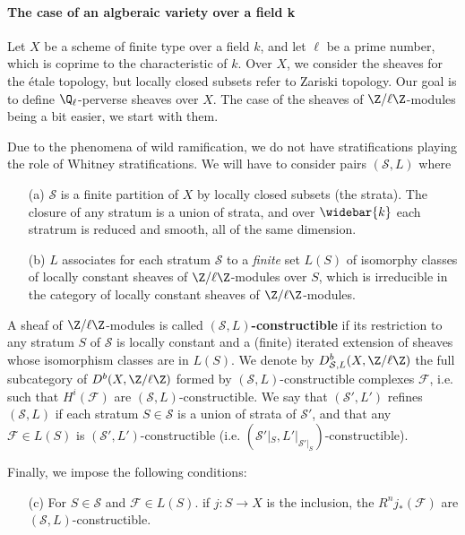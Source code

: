 \paragraph{The case of an algberaic variety over a field \texorpdfstring{k}{k}}
Let $X$ be a scheme of finite type over a field $k$, and let $\ell$ be a prime number, which is coprime to the characteristic of $k$. Over $X$, we consider the sheaves for the \'etale topology, but locally closed subsets refer to Zariski topology. Our goal is to define $\Q_\ell$-perverse sheaves over $X$. The case of the sheaves of $\Z/\ell\Z$-modules being a bit easier, we start with them.\par
Due to the phenomena of wild ramification, we do not have stratifications playing the role of Whitney stratifications. We will have to consider pairs $(\mathcal{S},L)$ where
\begin{enumerate}
    \item[(a)] $\mathcal{S}$ is a finite partition of $X$ by locally closed subsets (the strata). The closure of any stratum is a union of strata, and over $\widebar{k}$ each stratrum is reduced and smooth, all of the same dimension.
    \item[(b)] $L$ associates for each stratum $\mathcal{S}$ to a \textit{finite} set $L(S)$ of isomorphy classes of locally constant sheaves of $\Z/\ell\Z$-modules over $S$, which is irreducible in the category of locally constant sheaves of $\Z/\ell\Z$-modules.
\end{enumerate}

A sheaf of $\Z/\ell\Z$-modules is called \textbf{$(\mathcal{S},L)$-constructible} if its restriction to any stratum $S$ of $\mathcal{S}$ is locally constant and a (finite) iterated extension of sheaves whose isomorphism classes are in $L(S)$. We denote by $D^b_{\mathcal{S},L}(X,\Z/\ell\Z)$ the full subcategory of $D^b(X,\Z/\ell\Z)$ formed by $(\mathcal{S},L)$-constructible complexes $\mathscr{F}$, i.e. such that $H^i(\mathscr{F})$ are $(\mathcal{S},L)$-constructible. We say that $(\mathcal{S}',L')$ refines $(\mathcal{S},L)$ if each stratum $S\in\mathcal{S}$ is a union of strata of $\mathcal{S}'$, and that any $\mathscr{F}\in L(S)$ is $(\mathcal{S}',L')$-constructible (i.e. $(\mathcal{S}'|_S,L'|_{\mathcal{S}'|_S})$-constructible).\par
Finally, we impose the following conditions:
\begin{enumerate}
    \item[(c)] For $S\in\mathcal{S}$ and $\mathscr{F}\in L(S)$. if $j:S\to X$ is the inclusion, the $R^nj_*(\mathscr{F})$ are $(\mathcal{S},L)$-constructible.
\end{enumerate}

